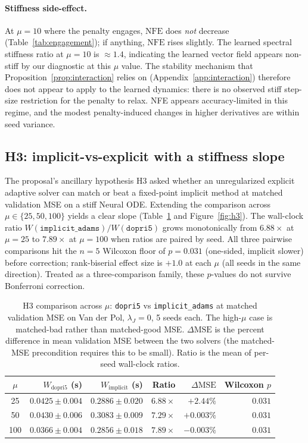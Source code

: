 \documentclass[11pt]{article}
\theoremstyle{plain}
\theoremstyle{definition}
\newcommand{\NFE}{\mathrm{NFE}}
\begin{document}
\paragraph{Stiffness side-effect.}
At $\mu = 10$ where the penalty engages, $\NFE$ does \emph{not} decrease
(Table~\ref{tab:engagement}); if anything, $\NFE$ rises slightly. The learned
spectral stiffness ratio at $\mu = 10$ is $\approx 1.4$, indicating the
learned vector field appears non-stiff by our diagnostic at this $\mu$ value.
The stability mechanism that
Proposition~\ref{prop:interaction} relies on (Appendix~\ref{app:interaction})
therefore does not appear to apply to the learned dynamics: there is no
observed stiff step-size restriction for the penalty to relax. NFE appears
accuracy-limited in this regime, and the modest penalty-induced changes in
higher derivatives are within seed variance.

\subsection{H3: implicit-vs-explicit with a stiffness slope}
\label{sec:h3}

The proposal's ancillary hypothesis H3 asked whether an unregularized
explicit adaptive solver can match or beat a fixed-point implicit method at
matched validation MSE on a stiff Neural ODE. Extending the comparison across
$\mu \in \{25, 50, 100\}$ yields a clear slope (Table~\ref{tab:h3} and
Figure~\ref{fig:h3}). The wall-clock ratio
$W(\texttt{implicit\_adams})/W(\texttt{dopri5})$ grows monotonically from
$6.88\times$ at $\mu = 25$ to $7.89\times$ at $\mu = 100$ when ratios are
paired by seed. All three pairwise comparisons hit the $n = 5$ Wilcoxon floor
of $p = 0.031$ (one-sided, implicit slower) before correction; rank-biserial
effect size is $+1.0$ at each $\mu$ (all seeds in the same direction). Treated
as a three-comparison family, these $p$-values do not survive Bonferroni
correction.

\begin{table}[t]
\centering
\caption{H3 comparison across $\mu$: \texttt{dopri5} vs \texttt{implicit\_adams}
  at matched validation MSE on Van der Pol, $\lambda_J = 0$, 5 seeds each.
  The high-$\mu$ case is matched-bad rather than matched-good MSE.
  $\Delta\mathrm{MSE}$ is the percent difference in mean validation MSE
  between the two solvers (the matched-MSE precondition requires this to be
  small). Ratio is the mean of per-seed wall-clock ratios.}
\label{tab:h3}
\begin{tabular}{c r r r r r}
\toprule
$\mu$ & $W_\text{dopri5}$ (s) & $W_\text{implicit}$ (s) & Ratio & $\Delta\mathrm{MSE}$ & Wilcoxon $p$ \\
\midrule
25  & $0.0425 \pm 0.004$ & $0.2886 \pm 0.020$ & $6.88\times$ & $+2.44\%$ & $0.031$ \\
50  & $0.0430 \pm 0.006$ & $0.3083 \pm 0.009$ & $7.29\times$ & $+0.003\%$ & $0.031$ \\
100 & $0.0366 \pm 0.004$ & $0.2856 \pm 0.018$ & $7.89\times$ & $-0.003\%$ & $0.031$ \\
\bottomrule
\end{tabular}
\end{table}
\end{document}
